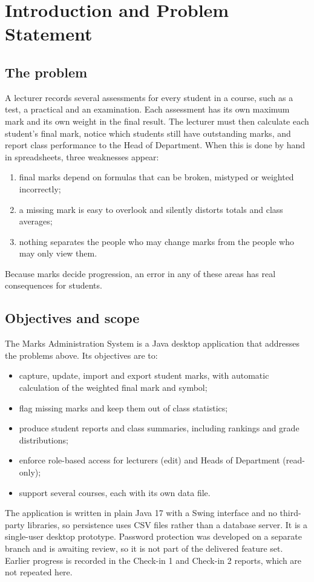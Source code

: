 \section{Introduction and Problem Statement}

\subsection{The problem}
A lecturer records several assessments for every student in a course, such as a test, a practical and an examination. Each assessment has its own maximum mark and its own weight in the final result. The lecturer must then calculate each student's final mark, notice which students still have outstanding marks, and report class performance to the Head of Department. When this is done by hand in spreadsheets, three weaknesses appear:
\begin{enumerate}
  \item final marks depend on formulas that can be broken, mistyped or weighted incorrectly;
  \item a missing mark is easy to overlook and silently distorts totals and class averages;
  \item nothing separates the people who may change marks from the people who may only view them.
\end{enumerate}
Because marks decide progression, an error in any of these areas has real consequences for students.

\subsection{Objectives and scope}
The Marks Administration System is a Java desktop application that addresses the problems above. Its objectives are to:
\begin{itemize}
  \item capture, update, import and export student marks, with automatic calculation of the weighted final mark and symbol;
  \item flag missing marks and keep them out of class statistics;
  \item produce student reports and class summaries, including rankings and grade distributions;
  \item enforce role-based access for lecturers (edit) and Heads of Department (read-only);
  \item support several courses, each with its own data file.
\end{itemize}
The application is written in plain Java 17 with a Swing interface and no third-party libraries, so persistence uses CSV files rather than a database server. It is a single-user desktop prototype. Password protection was developed on a separate branch and is awaiting review, so it is not part of the delivered feature set. Earlier progress is recorded in the Check-in 1 and Check-in 2 reports, which are not repeated here.

